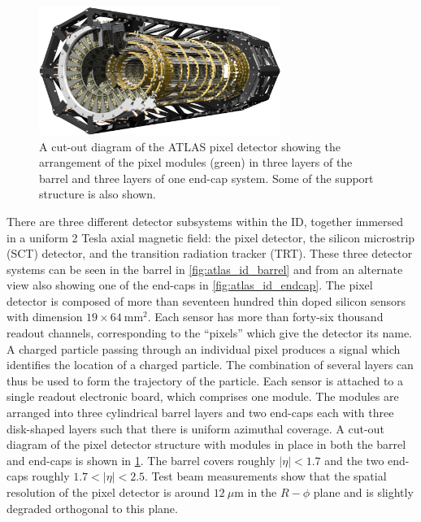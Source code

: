 \begin{figure}[ht!]
\centering
\includegraphics[width=0.7\textwidth]{figures/atlas/pixel.eps}
\caption{A cut-out diagram of the ATLAS pixel detector showing 
the arrangement of the pixel modules (green) in three layers of the barrel
and three layers of one end-cap system. Some of the support structure is
also shown.}
\label{fig:atlas_pixel}
\end{figure}

There are three different detector subsystems within the ID, together
immersed in a uniform 2 Tesla axial magnetic field: the pixel detector,
the silicon microstrip (SCT) detector, and the transition radiation
tracker (TRT). These three detector systems can be seen 
in the barrel in \fig\ref{fig:atlas_id_barrel} and from an alternate
view also showing one of the end-caps in \fig\ref{fig:atlas_id_endcap}. 
The pixel detector
is composed of more than seventeen hundred thin doped silicon sensors with 
dimension $19\times 64~\textrm{mm}^2$. Each sensor has more than forty-six
thousand readout channels,
corresponding to the ``pixels'' which give the detector its name. 
A charged particle passing through an individual pixel produces a signal
which identifies the location of a charged particle. The combination of 
several layers can thus be used to form the trajectory of the particle. %
Each sensor is attached to a single readout electronic board, which comprises
one module.
The modules are arranged into three cylindrical barrel layers and 
two end-caps each with three disk-shaped layers such that there is uniform
azimuthal coverage. A cut-out diagram of the pixel detector 
structure with modules in place in both the barrel and end-caps is shown 
in \fig\ref{fig:atlas_pixel}. The barrel covers roughly 
$|\eta|<1.7$ and the two end-caps roughly $1.7<|\eta|<2.5$.
Test beam measurements show that the 
spatial resolution of the pixel detector is around $12~\mu\textrm{m}$ in 
the $R-\phi$ plane and is slightly degraded orthogonal to this plane.



